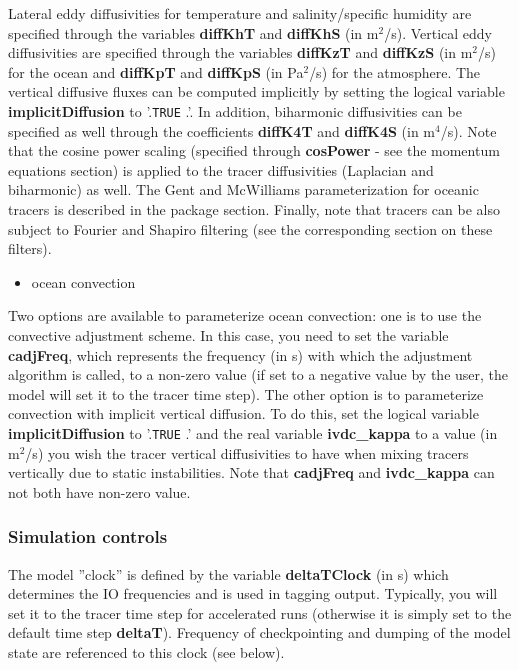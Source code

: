 Lateral eddy diffusivities for temperature and salinity/specific humidity
are specified through the variables \textbf{diffKhT }and \textbf{diffKhS }%
(in m$^{2}$/s). Vertical eddy diffusivities are specified through the
variables \textbf{diffKzT }and \textbf{diffKzS }(in m$^{2}$/s) for the ocean
and \textbf{diffKpT }and \textbf{diffKpS }(in Pa$^{2}$/s) for the
atmosphere. The vertical diffusive fluxes can be computed implicitly by
setting the logical variable \textbf{implicitDiffusion }to '.\texttt{TRUE}%
.'. In addition, biharmonic diffusivities can be specified as well through
the coefficients \textbf{diffK4T }and \textbf{diffK4S }(in m$^{4}$/s). Note
that the cosine power scaling (specified through \textbf{cosPower }- see the
momentum equations section) is applied to the tracer diffusivities
(Laplacian and biharmonic) as well. The Gent and McWilliams parameterization
for oceanic tracers is described in the package section. Finally, note that
tracers can be also subject to Fourier and Shapiro filtering (see the
corresponding section on these filters).

\begin{itemize}
\item ocean convection
\end{itemize}

Two options are available to parameterize ocean convection: one is to use
the convective adjustment scheme. In this case, you need to set the variable 
\textbf{cadjFreq}, which represents the frequency (in s) with which the
adjustment algorithm is called, to a non-zero value (if set to a negative
value by the user, the model will set it to the tracer time step). The other
option is to parameterize convection with implicit vertical diffusion. To do
this, set the logical variable \textbf{implicitDiffusion }to '.\texttt{TRUE}%
.' and the real variable \textbf{ivdc\_kappa }to a value (in m$^{2}$/s) you
wish the tracer vertical diffusivities to have when mixing tracers
vertically due to static instabilities. Note that \textbf{cadjFreq }and 
\textbf{ivdc\_kappa }can not both have non-zero value.

\subsubsection{Simulation controls}

The model ''clock'' is defined by the variable \textbf{deltaTClock }(in s)
which determines the IO frequencies and is used in tagging output.
Typically, you will set it to the tracer time step for accelerated runs
(otherwise it is simply set to the default time step \textbf{deltaT}).
Frequency of checkpointing and dumping of the model state are referenced to
this clock (see below).

